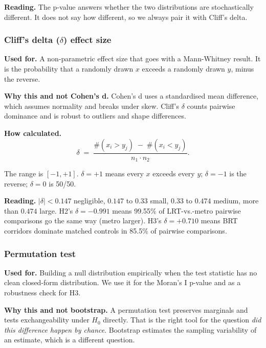 \textbf{Reading.} The p-value answers whether the two distributions
are stochastically different. It does not say how different, so we
always pair it with Cliff's delta.

\subsubsection{Cliff's delta \texorpdfstring{($\delta$)}{} effect size}

\textbf{Used for.} A non-parametric effect size that goes with a
Mann-Whitney result. It is the probability that a randomly drawn $x$
exceeds a randomly drawn $y$, minus the reverse.

\textbf{Why this and not Cohen's d.} Cohen's d uses a standardised
mean difference, which assumes normality and breaks under skew.
Cliff's $\delta$ counts pairwise dominance and is robust to outliers
and shape differences.

\textbf{How calculated.}
\begin{equation*}
 \delta \;=\; \frac{\#(x_i > y_j) \;-\; \#(x_i < y_j)}{n_1 \cdot n_2}.
\end{equation*}

The range is $[-1, +1]$. $\delta = +1$ means every $x$ exceeds every
$y$; $\delta = -1$ is the reverse; $\delta = 0$ is 50/50.

\textbf{Reading.} $|\delta| < 0.147$ negligible, $0.147$ to $0.33$
small, $0.33$ to $0.474$ medium, more than $0.474$ large. H2's
$\delta = -0.991$ means 99.55\% of LRT-vs.-metro pairwise comparisons
go the same way (metro larger). H3's $\delta = +0.710$ means BRT
corridors dominate matched controls in 85.5\% of pairwise
comparisons.

\subsubsection{Permutation test}

\textbf{Used for.} Building a null distribution empirically when the
test statistic has no clean closed-form distribution. We use it for
the Moran's I p-value and as a robustness check for H3.

\textbf{Why this and not bootstrap.} A permutation test preserves
marginals and tests exchangeability under $H_0$ directly. That is the
right tool for the question \emph{did this difference happen by
chance}. Bootstrap estimates the sampling variability of an
estimate, which is a different question.

